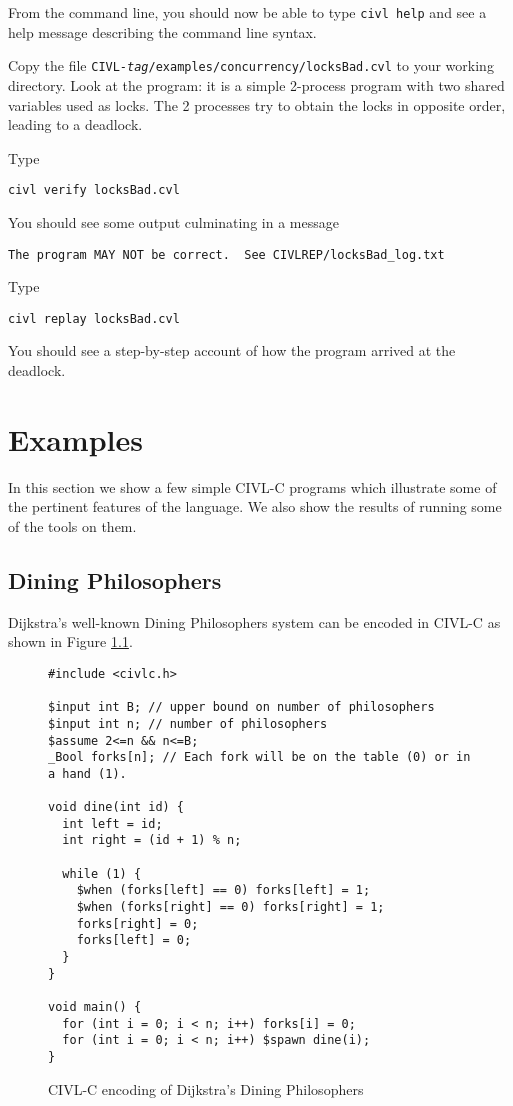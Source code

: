 From the command line, you should now be able to type \texttt{civl
  help} and see a help message describing the command line syntax.

Copy the file
\texttt{CIVL-\textit{tag}/examples/concurrency/locksBad.cvl} to your
working directory.  Look at the program: it is a simple 2-process
program with two shared variables used as locks.  The 2 processes try
to obtain the locks in opposite order, leading to a deadlock.

Type
\begin{verbatim}
civl verify locksBad.cvl
\end{verbatim}
You should see some output culminating in a message 
\begin{verbatim}
The program MAY NOT be correct.  See CIVLREP/locksBad_log.txt
\end{verbatim}

Type
\begin{verbatim}
civl replay locksBad.cvl
\end{verbatim}
You should see a step-by-step account of how the program arrived
at the deadlock.


\chapter{Examples}

In this section we show a few simple CIVL-C programs which illustrate
some of the pertinent features of the language. We also show the results
of running some of the tools on them.

\section{Dining Philosophers}

Dijkstra's well-known Dining Philosophers system can be encoded in
CIVL-C as shown in Figure \ref{fig:dining}.

\begin{figure}[t]
  \begin{small}
\begin{verbatim}
#include <civlc.h>

$input int B; // upper bound on number of philosophers
$input int n; // number of philosophers
$assume 2<=n && n<=B;
_Bool forks[n]; // Each fork will be on the table (0) or in a hand (1). 

void dine(int id) {
  int left = id;
  int right = (id + 1) % n;

  while (1) {
    $when (forks[left] == 0) forks[left] = 1;
    $when (forks[right] == 0) forks[right] = 1;
    forks[right] = 0;
    forks[left] = 0;
  }
}

void main() {
  for (int i = 0; i < n; i++) forks[i] = 0;
  for (int i = 0; i < n; i++) $spawn dine(i);
}
\end{verbatim}
  \end{small}
  \caption{CIVL-C encoding of Dijkstra's Dining Philosophers}
  \label{fig:dining}
\end{figure}

